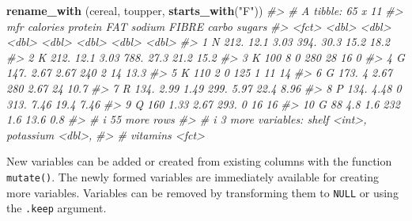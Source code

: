 \documentclass[
]{book}
\newenvironment{Shaded}{\begin{snugshade}}{\end{snugshade}}
\newcommand{\CommentTok}[1]{\textcolor[rgb]{0.56,0.35,0.01}{\textit{#1}}}
\newcommand{\FunctionTok}[1]{\textcolor[rgb]{0.13,0.29,0.53}{\textbf{#1}}}
\newcommand{\NormalTok}[1]{#1}
\newcommand{\StringTok}[1]{\textcolor[rgb]{0.31,0.60,0.02}{#1}}
\begin{document}
\begin{Shaded}
\begin{Highlighting}[]
\FunctionTok{rename\_with}\NormalTok{ (cereal, toupper, }\FunctionTok{starts\_with}\NormalTok{(}\StringTok{"F"}\NormalTok{))}
\CommentTok{\#\textgreater{} \# A tibble: 65 x 11}
\CommentTok{\#\textgreater{}    mfr   calories protein   FAT sodium FIBRE carbo sugars}
\CommentTok{\#\textgreater{}    \textless{}fct\textgreater{}    \textless{}dbl\textgreater{}   \textless{}dbl\textgreater{} \textless{}dbl\textgreater{}  \textless{}dbl\textgreater{} \textless{}dbl\textgreater{} \textless{}dbl\textgreater{}  \textless{}dbl\textgreater{}}
\CommentTok{\#\textgreater{}  1 N         212.   12.1   3.03   394. 30.3   15.2  18.2 }
\CommentTok{\#\textgreater{}  2 K         212.   12.1   3.03   788. 27.3   21.2  15.2 }
\CommentTok{\#\textgreater{}  3 K         100     8     0      280  28     16     0   }
\CommentTok{\#\textgreater{}  4 G         147.    2.67  2.67   240   2     14    13.3 }
\CommentTok{\#\textgreater{}  5 K         110     2     0      125   1     11    14   }
\CommentTok{\#\textgreater{}  6 G         173.    4     2.67   280   2.67  24    10.7 }
\CommentTok{\#\textgreater{}  7 R         134.    2.99  1.49   299.  5.97  22.4   8.96}
\CommentTok{\#\textgreater{}  8 P         134.    4.48  0      313.  7.46  19.4   7.46}
\CommentTok{\#\textgreater{}  9 Q         160     1.33  2.67   293.  0     16    16   }
\CommentTok{\#\textgreater{} 10 G          88     4.8   1.6    232   1.6   13.6   0.8 }
\CommentTok{\#\textgreater{} \# i 55 more rows}
\CommentTok{\#\textgreater{} \# i 3 more variables: shelf \textless{}int\textgreater{}, potassium \textless{}dbl\textgreater{},}
\CommentTok{\#\textgreater{} \#   vitamins \textless{}fct\textgreater{}}
\end{Highlighting}
\end{Shaded}

New variables can be added or created from existing columns with the function \texttt{mutate()}. The newly formed variables are immediately available for creating more variables. Variables can be removed by transforming them to \texttt{NULL} or using the \texttt{.keep} argument.
\end{document}
